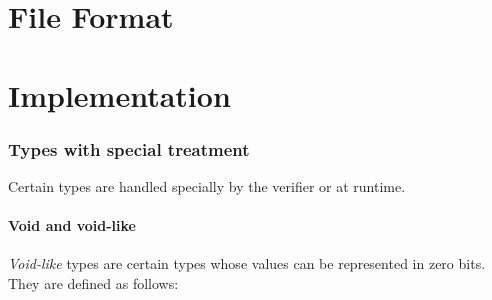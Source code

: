 \documentclass[a4paper]{book}
\begin{document}


\part{File Format}

\part{Implementation}

\section{Types with special treatment}

Certain types are handled specially by the verifier or at runtime.

\subsection{Void and void-like}
\emph{Void-like} types are certain types whose values can be
represented in zero bits.
They are defined as follows:
\end{document}
